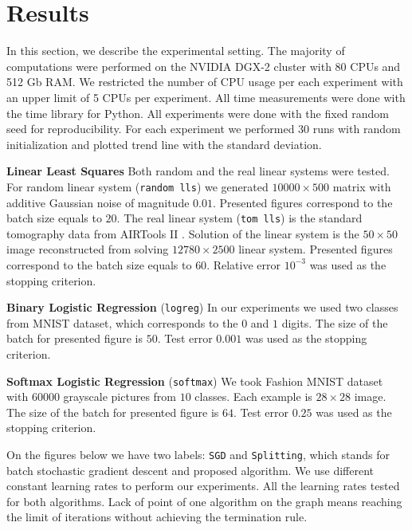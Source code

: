 \documentclass{article}
\begin{document}

\section{Results}

In this section, we describe the experimental setting. The majority of computations were performed on the NVIDIA DGX-2 cluster with 80 CPUs and 512 Gb RAM. We restricted the number of CPU usage per each experiment with an upper limit of 5 CPUs per experiment. All time measurements were done with the time library for Python. All experiments were done with the fixed random seed for reproducibility. For each experiment we performed 30 runs with random initialization and plotted trend line with the standard deviation.

\textbf{Linear Least Squares}  Both random and the real linear systems were tested. For random linear system (\texttt{random lls}) we generated $10000\times500$ matrix with additive Gaussian noise of magnitude $0.01$. Presented figures correspond to the batch size equals to $20$. The real linear system (\texttt{tom lls}) is the standard tomography data from AIRTools II \citet{hansen2018air}. Solution of the linear system is the $50 \times 50$ image reconstructed from solving $12780 \times 2500$ linear system. Presented figures correspond to the batch size equals to $60$. Relative error $10^{-3}$ was used as the stopping criterion.

\textbf{Binary Logistic Regression}  (\texttt{logreg}) In our experiments we used two classes from MNIST \citet{lecun1998gradient} dataset, which corresponds to the $0$ and $1$ digits. The size of the batch for presented figure is $50$. Test error $0.001$ was used as the stopping criterion.

\textbf{Softmax Logistic Regression} (\texttt{softmax}) We took Fashion MNIST \citet{xiao2017fashion} dataset with $60000$ grayscale pictures from $10$ classes. Each example is $28 \times 28$ image. The size of the batch for presented figure is $64$. Test error $0.25$ was used as the stopping criterion.

On the figures below we have two labels: \texttt{SGD} and \texttt{Splitting}, which stands for batch stochastic gradient descent and proposed algorithm. We use different constant learning rates to perform our experiments. All the learning rates tested for both algorithms. Lack of point of one algorithm on the graph means reaching the limit of iterations without achieving the termination rule.
\end{document}
